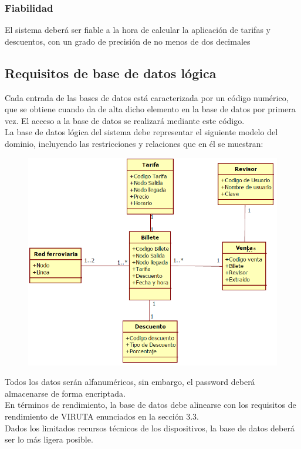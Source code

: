 \subsubsection{Fiabilidad}

El sistema deberá ser fiable a la hora de calcular la aplicación de tarifas y descuentos, con un grado de precisión de no menos de dos decimales

\subsection{Requisitos de base de datos lógica}

Cada entrada de las bases de datos está caracterizada por un código numérico, que se obtiene cuando da de alta dicho elemento en la base de datos por primera vez. El acceso a la base de datos se realizará mediante este código.\\

La base de datos lógica del sistema debe representar el siguiente modelo del dominio, incluyendo las restricciones y relaciones que en él se muestran:\\



\begin{figure}[h]
\centering
\includegraphics[width=0.7\linewidth]{./captura}
\label{fig:captura}
\end{figure}


Todos los datos serán alfanuméricos, sin embargo, el password deberá almacenarse de forma encriptada.\\

En términos de rendimiento, la base de datos debe alinearse con los requisitos de rendimiento de VIRUTA enunciados en la sección 3.3.\\

Dados los limitados recursos técnicos de los dispositivos, la base de datos deberá ser lo más ligera posible.
